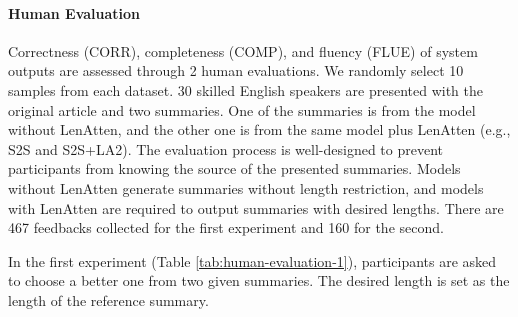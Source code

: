 \documentclass[11pt,a4paper]{article}
\begin{document}
\paragraph{Human Evaluation}
\label{sec:experiment-human}
Correctness (CORR), completeness (COMP), and fluency (FLUE) of system outputs are assessed through 2 human evaluations. We randomly select 10 samples from each dataset. 30 skilled English speakers are presented with the original article and two summaries. One of the summaries is from the model without LenAtten, and the other one is from the same model plus LenAtten (e.g., \textsc{S2S} and \textsc{S2S+LA2}). The evaluation process is well-designed to prevent participants from knowing the source of the presented summaries. Models without LenAtten generate summaries without length restriction, and models with LenAtten are required to output summaries with desired lengths. There are 467 feedbacks collected for the first experiment and 160 for the second.

In the first experiment (Table \ref{tab:human-evaluation-1}), participants are asked to choose a better one from two given summaries. The desired length is set as the length of the reference summary.
\end{document}
